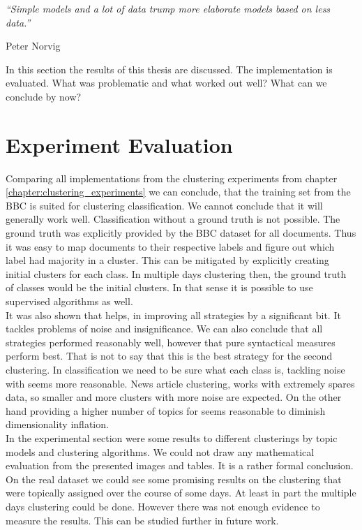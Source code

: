 \epigraph{\emph{
  ``Simple models and a lot of data trump more elaborate models based on less data.''
}}{ Peter Norvig }

In this section the results of this thesis are discussed. The implementation is evaluated. What was problematic and what worked out well? What can we conclude by now?


\section{Experiment Evaluation}
Comparing all implementations from the clustering experiments from chapter \ref{chapter:clustering_experiments} we can conclude, that the training set from the BBC is suited for clustering classification. We cannot conclude that it will generally work well. Classification without a ground truth is not possible. The ground truth was explicitly provided by the BBC dataset for all documents. Thus it was easy to map documents to their respective labels and figure out which label had majority in a cluster. This can be mitigated by explicitly creating initial clusters for each class. In multiple days clustering then, the ground truth of classes would be the initial clusters. In that sense it is possible to use supervised algorithms as well.\\

It was also shown that \lsa{} helps, in improving all strategies by a significant bit. It tackles problems of noise and insignificance. We can also conclude that all strategies performed reasonably well, however that pure syntactical measures perform best. That is not to say that this is the best strategy for the second clustering. In classification we need to be sure what each class is, tackling noise with \lsa{} seems more reasonable. News article clustering, works with extremely spares data, so smaller and more clusters with more noise are expected. On the other hand providing a higher number of topics for \lsa{} seems reasonable to diminish dimensionality inflation.\\

In the experimental section were some results to different clusterings by topic models and clustering algorithms. We could not draw any mathematical evaluation from the presented images and tables. It is a rather formal conclusion. On the real dataset we could see some promising results on the clustering that were topically assigned over the course of some days. At least in part the multiple days clustering could be done. However there was not enough evidence to measure the results. This can be studied further in future work.

